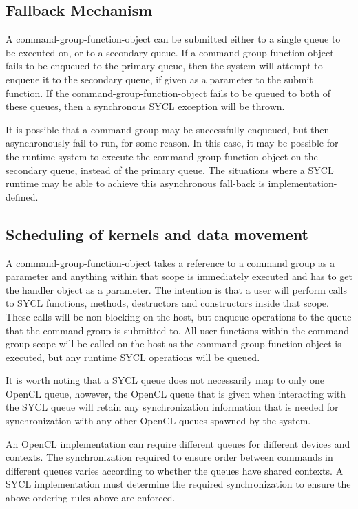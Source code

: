\subsection{Fallback Mechanism}

A \gls{command-group-function-object} can be submitted either to a single queue 
to be executed on, or to a secondary queue. If a
\gls{command-group-function-object} fails to be enqueued to the primary queue, then
the system will attempt to enqueue it to the secondary queue, if given as a
parameter to the submit function. If the \gls{command-group-function-object} fails to be
queued to both of these queues, then a synchronous SYCL exception will be thrown.

It is possible that a command group may be successfully enqueued,
but then asynchronously fail to run, for some reason. In this case, it may be
possible for the runtime system to execute the \gls{command-group-function-object}
on the secondary queue, instead of the primary queue. The situations where a SYCL
runtime may be able to achieve this asynchronous fall-back is implementation-defined.

\subsection{Scheduling of kernels and data movement}

A \gls{command-group-function-object} takes a reference to a command group
 as a parameter and anything within that scope is
immediately executed and has to get the handler object as a parameter. The
intention is that a user will perform calls to SYCL functions, methods,
destructors and constructors inside that scope. These calls will be non-blocking
on the host, but enqueue operations to the queue that the command group is submitted
to. All user functions within the command group scope will be called on the host
as the \gls{command-group-function-object} is executed, but any runtime SYCL
operations will be queued.

It is worth noting that a SYCL queue does not necessarily map to only one OpenCL
queue, however, the OpenCL queue that is given when interacting with the SYCL
queue will retain any synchronization information that is needed for synchronization
with any other OpenCL queues spawned by the system.

An OpenCL implementation can require different queues for different devices and
contexts. The synchronization required to ensure order between commands in
different queues varies according to whether the queues have shared contexts.
A SYCL implementation must determine the required synchronization to ensure the
above ordering rules above are enforced.

